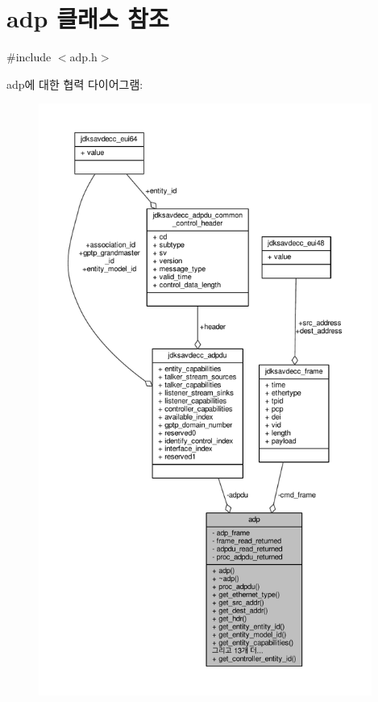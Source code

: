 \hypertarget{classavdecc__lib_1_1adp}{}\section{adp 클래스 참조}
\label{classavdecc__lib_1_1adp}


{\ttfamily \#include $<$adp.\+h$>$}



adp에 대한 협력 다이어그램\+:
\nopagebreak
\begin{figure}[H]
\begin{center}
\leavevmode
\includegraphics[height=550pt]{classavdecc__lib_1_1adp__coll__graph}
\end{center}
\end{figure}
